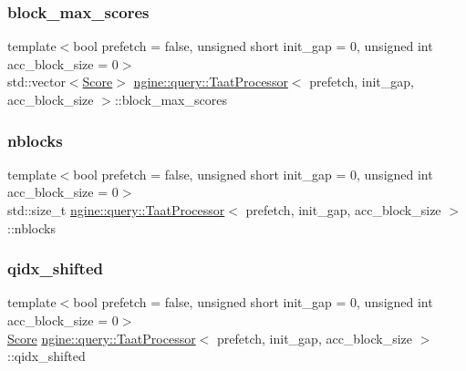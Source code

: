 \subsubsection{\texorpdfstring{block\+\_\+max\+\_\+scores}{block\_max\_scores}}
{\footnotesize\ttfamily template$<$bool prefetch = false, unsigned short init\+\_\+gap = 0, unsigned int acc\+\_\+block\+\_\+size = 0$>$ \\
std\+::vector$<$\hyperlink{structngine_1_1Score}{Score}$>$ \hyperlink{classngine_1_1query_1_1TaatProcessor}{ngine\+::query\+::\+Taat\+Processor}$<$ prefetch, init\+\_\+gap, acc\+\_\+block\+\_\+size $>$\+::block\+\_\+max\+\_\+scores\hspace{0.3cm}{\ttfamily [protected]}}

\mbox{\label{classngine_1_1query_1_1TaatProcessor_aa37c683d30eea3d01a629841923d8407}} 
\subsubsection{\texorpdfstring{nblocks}{nblocks}}
{\footnotesize\ttfamily template$<$bool prefetch = false, unsigned short init\+\_\+gap = 0, unsigned int acc\+\_\+block\+\_\+size = 0$>$ \\
std\+::size\+\_\+t \hyperlink{classngine_1_1query_1_1TaatProcessor}{ngine\+::query\+::\+Taat\+Processor}$<$ prefetch, init\+\_\+gap, acc\+\_\+block\+\_\+size $>$\+::nblocks\hspace{0.3cm}{\ttfamily [protected]}}

\mbox{\label{classngine_1_1query_1_1TaatProcessor_aa826aadc136dfd788b88dcaa25aeecae}} 
\subsubsection{\texorpdfstring{qidx\+\_\+shifted}{qidx\_shifted}}
{\footnotesize\ttfamily template$<$bool prefetch = false, unsigned short init\+\_\+gap = 0, unsigned int acc\+\_\+block\+\_\+size = 0$>$ \\
\hyperlink{structngine_1_1Score}{Score} \hyperlink{classngine_1_1query_1_1TaatProcessor}{ngine\+::query\+::\+Taat\+Processor}$<$ prefetch, init\+\_\+gap, acc\+\_\+block\+\_\+size $>$\+::qidx\+\_\+shifted\hspace{0.3cm}{\ttfamily [protected]}}

